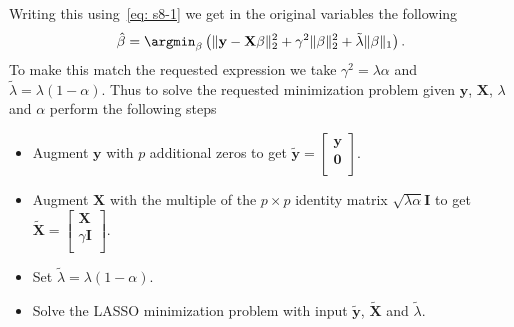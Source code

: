 \documentclass[10pt]{article}
\begin{document}
\begin{enumerate}[1.]
Writing this using~\eqref{eq: s8-1} we get in the original variables the following 
\begin{equation*}
\hat{\beta} = \argmin_{\beta} \left( \Vert\mathbf{y}-\mathbf{X}\beta\Vert_{2}^{2} + \gamma^{2}\Vert\beta\Vert_{2}^{2} +\tilde{\lambda}\Vert\beta\Vert_{1}\right).
\end{equation*}
To make this match the requested expression we take $\gamma^{2} = \lambda\alpha$ and $\tilde{\lambda} = \lambda(1-\alpha)$. Thus to solve the requested minimization problem given $\mathbf{y}$, $\mathbf{X}$, $\lambda$ and $\alpha$ perform the following steps
\begin{itemize}
	\item Augment $\mathbf{y}$ with $p$ additional zeros to get $\tilde{\mathbf{y}} = \left[ \begin{array}{c}
	\mathbf{y}\\
	\mathbf{0}\\
	\end{array}\right]$.
	
	\item Augment $\mathbf{X}$ with the multiple of the $p\times p$ identity matrix $\sqrt{\lambda\alpha}\mathbf{I}$ to get $\tilde{\mathbf{X}} = \left[ \begin{array}{c}
	\mathbf{X}\\
	\gamma\mathbf{I}\\
	\end{array}\right]$.
	
	\item Set $\tilde{\lambda} = \lambda(1-\alpha)$.
	
	\item Solve the LASSO minimization problem with input $\tilde{\mathbf{y}}$, $\tilde{\mathbf{X}}$ and $\tilde{\lambda}$.
\end{itemize}
\end{enumerate}
% 
% 
% 
% 
% 



\end{document}
